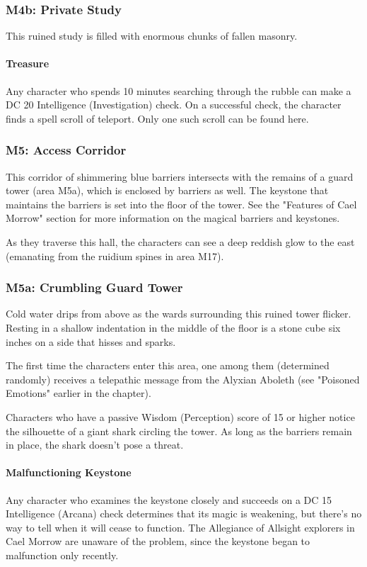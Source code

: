 \documentclass[10pt,a4paper,twoside,twocolumn,openany,nodeprecatedcode]{dndbook}
\begin{document}
\subsubsection{M4b: Private Study}
This ruined study is filled with enormous chunks of fallen masonry.

\paragraph{Treasure}
Any character who spends 10 minutes searching through the rubble can make a DC 20 Intelligence (Investigation) check. On a successful check, the character finds a spell scroll of teleport. Only one such scroll can be found here.

\subsubsection{M5: Access Corridor}
This corridor of shimmering blue barriers intersects with the remains of a guard tower (area M5a), which is enclosed by barriers as well. The keystone that maintains the barriers is set into the floor of the tower. See the "Features of Cael Morrow" section for more information on the magical barriers and keystones.

As they traverse this hall, the characters can see a deep reddish glow to the east (emanating from the ruidium spines in area M17).

\subsubsection{M5a: Crumbling Guard Tower}
\begin{DndReadAloud}{}
Cold water drips from above as the wards surrounding this ruined tower flicker. Resting in a shallow indentation in the middle of the floor is a stone cube six inches on a side that hisses and sparks.

\end{DndReadAloud}

The first time the characters enter this area, one among them (determined randomly) receives a telepathic message from the Alyxian Aboleth (see "Poisoned Emotions" earlier in the chapter).

Characters who have a passive Wisdom (Perception) score of 15 or higher notice the silhouette of a giant shark circling the tower. As long as the barriers remain in place, the shark doesn't pose a threat.

\paragraph{Malfunctioning Keystone}
Any character who examines the keystone closely and succeeds on a DC 15 Intelligence (Arcana) check determines that its magic is weakening, but there's no way to tell when it will cease to function. The Allegiance of Allsight explorers in Cael Morrow are unaware of the problem, since the keystone began to malfunction only recently.
\end{document}
